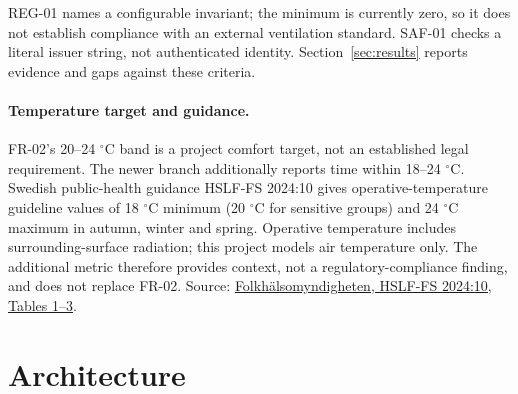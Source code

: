 \documentclass[11pt,a4paper]{article}
\begin{document}
REG-01 names a configurable invariant; the minimum is currently zero, so it does not establish compliance with an external ventilation standard. SAF-01 checks a literal issuer string, not authenticated identity. Section~\ref{sec:results} reports evidence and gaps against these criteria.

\paragraph{Temperature target and guidance.}
FR-02's 20--24 $^\circ$C band is a project comfort target, not an established legal requirement. The newer branch additionally reports time within 18--24 $^\circ$C. Swedish public-health guidance HSLF-FS 2024:10 gives operative-temperature guideline values of 18 $^\circ$C minimum (20 $^\circ$C for sensitive groups) and 24 $^\circ$C maximum in autumn, winter and spring. Operative temperature includes surrounding-surface radiation; this project models air temperature only. The additional metric therefore provides context, not a regulatory-compliance finding, and does not replace FR-02.
Source: \href{https://www.folkhalsomyndigheten.se/contentassets/1c28701a4c8f49cabce85e3bb65695dc/hslf-fs-2024-10.pdf}{Folkh\"alsomyndigheten, HSLF-FS 2024:10, Tables 1--3}.

\section{Architecture}
\end{document}
